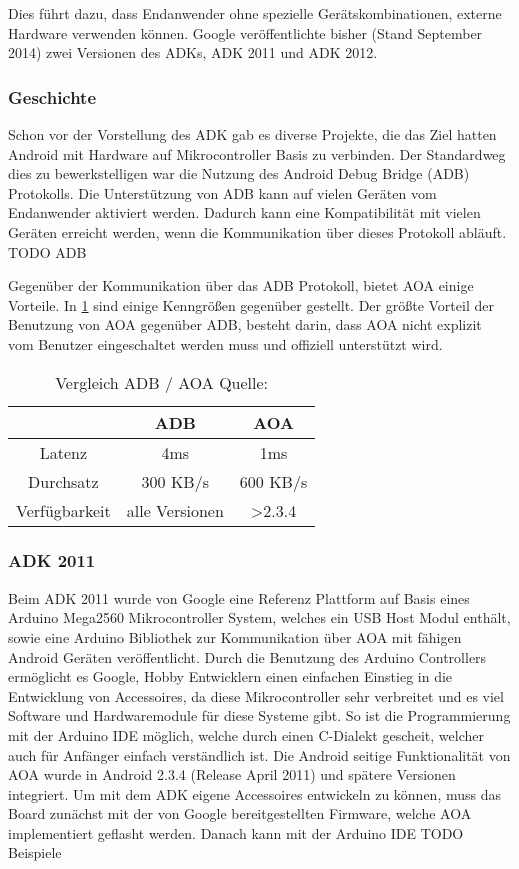 \documentclass[12pt,journal,compsoc]{IEEEtran}
\begin{document}
Dies führt dazu, dass Endanwender ohne spezielle Gerätskombinationen, externe Hardware verwenden können.
Google veröffentlichte bisher (Stand September 2014) zwei Versionen des ADKs, ADK 2011 und ADK 2012. 

\subsubsection{Geschichte}
Schon vor der Vorstellung des ADK gab es diverse Projekte, die das Ziel hatten Android mit Hardware auf Mikrocontroller Basis zu verbinden.
Der Standardweg dies zu bewerkstelligen war die Nutzung des Android Debug Bridge (ADB) Protokolls.
Die Unterstützung von ADB kann auf vielen Geräten vom Endanwender aktiviert werden. Dadurch kann eine Kompatibilität mit vielen Geräten erreicht werden, wenn die Kommunikation über dieses Protokoll abläuft. TODO ADB

Gegenüber der Kommunikation über das ADB Protokoll, bietet AOA einige Vorteile. In \ref{table:vergl} sind einige Kenngrößen gegenüber gestellt. Der größte Vorteil der Benutzung von AOA gegenüber ADB, besteht darin, dass AOA nicht explizit vom Benutzer eingeschaltet werden muss und offiziell unterstützt wird.


\begin{table}
	\centering
	\caption{Vergleich ADB / AOA Quelle: \cite{comp}}
	\label{table:vergl}
	\begin{tabular}{c | c | c}
		& ADB & AOA \\ \hline
		Latenz & 4ms & 1ms \\ \hline
		Durchsatz & 300 KB/s & 600 KB/s \\ \hline
		Verfügbarkeit & alle Versionen & \textgreater 2.3.4 \\ \hline
	\end{tabular}
\end{table}


\subsubsection{ADK 2011}
Beim ADK 2011 wurde von Google eine
Referenz Plattform auf Basis eines Arduino Mega2560 Mikrocontroller System, welches ein USB Host Modul enthält, sowie eine Arduino Bibliothek zur Kommunikation über AOA mit fähigen Android Geräten veröffentlicht.
Durch die Benutzung des Arduino Controllers ermöglicht es Google, Hobby Entwicklern einen einfachen Einstieg in die Entwicklung von Accessoires, da diese Mikrocontroller sehr verbreitet und es viel Software und Hardwaremodule für diese Systeme gibt.
So ist die Programmierung mit der Arduino IDE möglich, welche durch einen C-Dialekt gescheit, welcher auch für Anfänger einfach verständlich ist.
Die Android seitige Funktionalität von AOA wurde in Android 2.3.4 (Release April 2011) und spätere Versionen integriert. 
Um mit dem ADK eigene Accessoires entwickeln zu können, muss das Board zunächst mit der von Google bereitgestellten Firmware, welche AOA implementiert geflasht werden.
Danach kann mit der Arduino IDE 
TODO Beispiele
\end{document}
